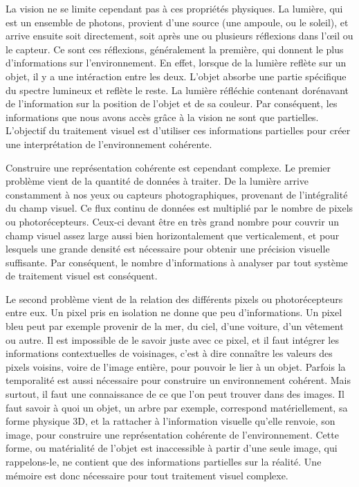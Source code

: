 	La vision ne se limite cependant pas à ces propriétés physiques. La lumière, qui est un ensemble de photons, provient d'une source (une ampoule, ou le soleil), et arrive ensuite soit directement, soit après une ou plusieurs réflexions dans l'œil ou le capteur. Ce sont ces réflexions, généralement la première, qui donnent le plus d'informations sur l'environnement. En effet, lorsque de la lumière reflète sur un objet, il y a une intéraction entre les deux. L'objet absorbe une partie spécifique du spectre lumineux et reflète le reste. La lumière réfléchie contenant dorénavant de l'information sur la position de l'objet et de sa couleur. Par conséquent, les informations que nous avons accès grâce à la vision ne sont que partielles. L'objectif du traitement visuel est d'utiliser ces informations partielles pour créer une interprétation de l'environnement cohérente.

	Construire une représentation cohérente est cependant complexe. Le premier problème vient de la quantité de données à traiter. De la lumière arrive constamment à nos yeux ou capteurs photographiques, provenant de l'intégralité du champ visuel. Ce flux continu de données est multiplié par le nombre de pixels ou photorécepteurs. Ceux-ci devant être en très grand nombre pour couvrir un champ visuel assez large aussi bien horizontalement que verticalement, et pour lesquels une grande densité est nécessaire pour obtenir une précision visuelle suffisante. Par conséquent, le nombre d'informations à analyser par tout système de traitement visuel est conséquent.

	Le second problème vient de la relation des différents pixels ou photorécepteurs entre eux. Un pixel pris en isolation ne donne que peu d'informations. Un pixel bleu peut par exemple provenir de la mer, du ciel, d'une voiture, d'un vêtement ou autre. Il est impossible de le savoir juste avec ce pixel, et il faut intégrer les informations contextuelles de voisinages, c'est à dire connaître les valeurs des pixels voisins, voire de l'image entière, pour pouvoir le lier à un objet. Parfois la temporalité est aussi nécessaire pour construire un environnement cohérent. Mais surtout, il faut une connaissance de ce que l'on peut trouver dans des images. Il faut savoir à quoi un objet, un arbre par exemple, correspond matériellement, sa forme physique 3D, et la rattacher à l'information visuelle qu'elle renvoie, son image, pour construire une représentation cohérente de l'environnement. Cette forme, ou matérialité de l'objet est inaccessible à partir d'une seule image, qui rappelons-le, ne contient que des informations partielles sur la réalité. Une mémoire est donc nécessaire pour tout traitement visuel complexe.

